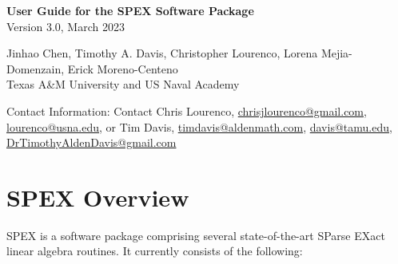 \documentclass[12pt]{report}
\theoremstyle{definition}
\begin{document}
\begin{center}
\begin{large}
\textbf{User Guide for the SPEX Software Package} \\
\vspace{5mm}
Version 3.0, March 2023 %
\vspace{20mm}

Jinhao Chen,  Timothy A. Davis, Christopher Lourenco, Lorena Mejia-Domenzain, Erick Moreno-Centeno  \\

Texas A\&M University and US Naval Academy

\vspace{20mm}
Contact Information: Contact Chris Lourenco, \href{mailto:chrisjlourenco@gmail.com}{chrisjlourenco@gmail.com}, \href{mailto:lourenco@usna.edu}{lourenco@usna.edu}, or Tim Davis,
\href{mailto:timdavis@aldenmath.com}{timdavis@aldenmath.com},
\href{mailto:davis@tamu.edu}{davis@tamu.edu},
\href{DrTimothyAldenDavis@gmail.com}{DrTimothyAldenDavis@gmail.com}

\end{large}
\end{center}

\newpage
\tableofcontents

\newpage
    
\chapter{SPEX Overview}

SPEX is a software package comprising several state-of-the-art SParse EXact
linear algebra routines. It currently consists of the following:
\end{document}

